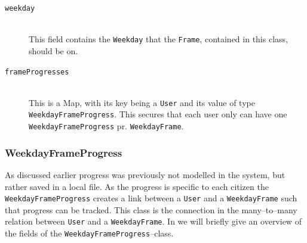 \begin{table}[ht]
    \caption{Table that represents the \texttt{WeekdayFrame} class}
    \label{tbl:WeekdayFrame}
\end{table}

\begin{description}
    \item [\texttt{weekday}] \hfill \\
    This field contains the \texttt{Weekday} that the \texttt{Frame}, contained in this class, should be on.
    \item [\texttt{frameProgresses}] \hfill \\
    This is a Map, with its key being a \texttt{User} and its value of type \texttt{WeekdayFrameProgress}.
    This secures that each user only can have one \texttt{WeekdayFrameProgress} pr. \texttt{WeekdayFrame}.
\end{description}

\subsubsection{WeekdayFrameProgress}\label{subsubsec:weekdayframeprogress}
As discussed earlier progress was previously not modelled in the system, but rather saved in a local file.
As the progress is specific to each citizen the \texttt{WeekdayFrameProgress} creates a link between a \texttt{User} and a \texttt{WeekdayFrame} such that progress can be tracked.
This class is the connection in the many--to--many relation between \texttt{User} and a \texttt{WeekdayFrame}.
In  we will briefly give an overview of the fields of the \texttt{WeekdayFrameProgress}--class.

